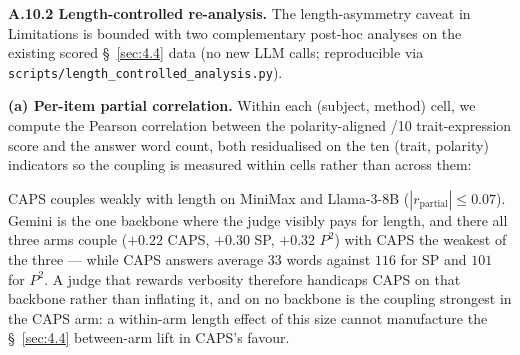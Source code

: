 \label{app:A.10.2}
\textbf{A.10.2 Length-controlled re-analysis.} The length-asymmetry caveat in Limitations is bounded with two complementary post-hoc analyses on the existing scored \S~\ref{sec:4.4} data (no new LLM calls; reproducible via \texttt{scripts/\allowbreak{}length\_\allowbreak{}controlled\_\allowbreak{}analysis.py}).

\textbf{(a) Per-item partial correlation.} Within each (subject, method) cell, we compute the Pearson correlation between the polarity-aligned /10 trait-expression score and the answer word count, both residualised on the ten (trait, polarity) indicators so the coupling is measured within cells rather than across them:

\begin{table}[t]
\centering
{}
\caption{Per-(subject, method) partial correlation between answer word count and polarity-aligned /10 trait-expression score, controlling for trait $\times$ polarity. On every backbone the strongest coupling sits in a baseline arm rather than in CAPS, and CAPS is also the shortest arm everywhere, so any verbosity confound runs \textit{against} CAPS.}
\label{tab:length-partial-r}
\end{table}

CAPS couples weakly with length on MiniMax and Llama-3-8B ($|r_\text{partial}| \leq 0.07$). Gemini is the one backbone where the judge visibly pays for length, and there all three arms couple ($+0.22$ CAPS, $+0.30$ SP, $+0.32$ $P^{\!2}$) with CAPS the weakest of the three --- while CAPS answers average $33$ words against $116$ for SP and $101$ for $P^{\!2}$. A judge that rewards verbosity therefore handicaps CAPS on that backbone rather than inflating it, and on no backbone is the coupling strongest in the CAPS arm: a within-arm length effect of this size cannot manufacture the \S~\ref{sec:4.4} between-arm lift in CAPS's favour.

